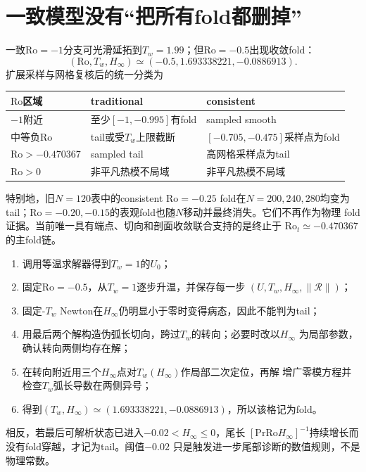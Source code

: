 \documentclass[UTF8,zihao=-4,openany]{ctexbook}
\newcommand{\Ro}{\mathrm{Ro}}
\newcommand{\Pran}{\mathrm{Pr}}
\newcommand{\R}{\mathcal R}
\begin{document}
\section{一致模型没有“把所有fold都删掉”}

一致$\Ro=-1$分支可光滑延拓到$T_w=1.99$；但$\Ro=-0.5$出现收敛fold：
\begin{equation}
 (\Ro,T_w,H_\infty)\simeq(-0.5,1.693338221,-0.0886913).
\end{equation}
扩展采样与网格复核后的统一分类为
\begin{center}
\begin{tabular}{p{}p{}p{}}
\toprule
$\Ro$区域 & traditional & consistent\\
\midrule
$-1$附近 & 至少$[-1,-0.995]$有fold & sampled smooth\\
中等负$\Ro$ & tail或受$T_w$上限截断 & $[-0.705,-0.475]$采样点为fold\\
$\Ro>-0.470367$ & sampled tail & 高网格采样点为tail\\
$\Ro>0$ & 非平凡热模不局域 & 非平凡热模不局域\\
\bottomrule
\end{tabular}
\end{center}
特别地，旧$N=120$表中的consistent $\Ro=-0.25$ fold在$N=200,240,280$均变为
tail；$\Ro=-0.20,-0.15$的表观fold也随$N$移动并最终消失。它们不再作为物理
fold证据。当前唯一具有端点、切向和剖面收敛联合支持的是终止于
$\Ro_t\simeq-0.470367$的主fold链。

\begin{derivationbox}[：以consistent、$\Ro=-0.5$为例复现一个“fold”格]
\begin{enumerate}
  \item 调用等温求解器得到$T_w=1$的$U_0$；
  \item 固定$\Ro=-0.5$，从$T_w=1$逐步升温，并保存每一步
  $(U,T_w,H_\infty,\|\R\|)$；
  \item 固定-$T_w$ Newton在$H_\infty$仍明显小于零时变得病态，因此不能判为tail；
  \item 用最后两个解构造伪弧长切向，跨过$T_w$的转向；必要时改以$H_\infty$
  为局部参数，确认转向两侧均存在解；
  \item 在转向附近用三个$H_\infty$点对$T_w(H_\infty)$作局部二次定位，再解
  增广零模方程并检查$T_w$弧长导数在两侧异号；
  \item 得到$(T_w,H_\infty)\simeq(1.693338221,-0.0886913)$，所以该格记为fold。
\end{enumerate}
相反，若最后可解析状态已进入$-0.02<H_\infty\le0$，尾长
$[\Pran\Ro H_\infty]^{-1}$持续增长而没有fold穿越，才记为tail。阈值$-0.02$
只是触发进一步尾部诊断的数值规则，不是物理常数。
\end{derivationbox}
\end{document}

